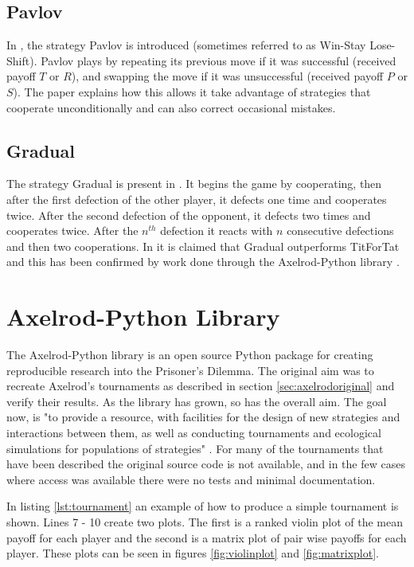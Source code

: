 \subsection{Pavlov}\label{ssec:pavlov}
In \cite{Nowak1993}, the strategy Pavlov is introduced (sometimes referred to as Win-Stay Lose-Shift).
Pavlov plays by repeating its previous move if it was successful (received payoff $T$ or $R$), and swapping the move if it was unsuccessful (received payoff $P$ or $S$).
The paper explains how this allows it take advantage of strategies that cooperate unconditionally and can also correct occasional mistakes.

\subsection{Gradual}\label{ssec:gradual}
The strategy Gradual is present in \cite{Beaufils1997}.
It begins the game by cooperating, then after the first defection of the other player, it defects one time and cooperates twice.
After the second defection of the opponent, it defects two times and cooperates twice.
After the $n^{th}$ defection it reacts with $n$ consecutive defections and then two cooperations.
In \cite{Beaufils1997} it is claimed that Gradual outperforms TitForTat and this has been confirmed by work done through the Axelrod-Python library \cite{Knight2016}.

\section{Axelrod-Python Library}

The Axelrod-Python library \cite{axelrodproject} is an open source Python package for creating reproducible research into the Prisoner's Dilemma.
The original aim was to recreate Axelrod's tournaments as described in section \ref{sec:axelrodoriginal} and verify their results.
As the library has grown, so has the overall aim.
The goal now, is "to provide a resource, with facilities for the design of new strategies and interactions between them, as well as conducting tournaments and ecological simulations for populations of strategies" \cite{Knight2016}.
For many of the tournaments that have been described the original source code is not available, and in the few cases where access was available there were no tests and minimal documentation.

In listing \ref{lst:tournament} an example of how to produce a simple tournament is shown.
Lines 7 - 10 create two plots.
The first is a ranked violin plot of the mean payoff for each player and the second is a matrix plot of pair wise payoffs for each player.
These plots can be seen in figures \ref{fig:violinplot} and \ref{fig:matrixplot}.

